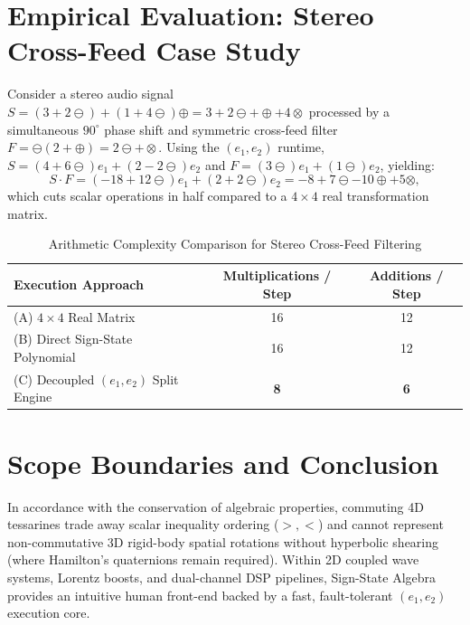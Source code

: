 \documentclass[11pt,a4paper]{article}
\begin{document}
\section{Empirical Evaluation: Stereo Cross-Feed Case Study}
Consider a stereo audio signal $S = (3 + 2\ominus) + (1 + 4\ominus)\oplus = 3 + 2\ominus + \oplus + 4\otimes$ processed by a simultaneous $90^\circ$ phase shift and symmetric cross-feed filter $F = \ominus(2 + \oplus) = 2\ominus + \otimes$. Using the $(e_1, e_2)$ runtime, $S = (4 + 6\ominus)e_1 + (2 - 2\ominus)e_2$ and $F = (3\ominus)e_1 + (1\ominus)e_2$, yielding:
\begin{equation}
S \cdot F = (-18 + 12\ominus)e_1 + (2 + 2\ominus)e_2 = -8 + 7\ominus - 10\oplus + 5\otimes,
\end{equation}
which cuts scalar operations in half compared to a $4 \times 4$ real transformation matrix.

\begin{table}[h]
\centering
\caption{Arithmetic Complexity Comparison for Stereo Cross-Feed Filtering}
\label{tab:benchmark}
\begin{tabular}{@{}lcc@{}}
\toprule
Execution Approach & Multiplications / Step & Additions / Step \\
\midrule
(A) $4 \times 4$ Real Matrix & 16 & 12 \\
(B) Direct Sign-State Polynomial & 16 & 12 \\
(C) Decoupled $(e_1, e_2)$ Split Engine & \textbf{8} & \textbf{6} \\
\bottomrule
\end{tabular}
\end{table}

\section{Scope Boundaries and Conclusion}
In accordance with the conservation of algebraic properties, commuting 4D tessarines trade away scalar inequality ordering ($>, <$) and cannot represent non-commutative 3D rigid-body spatial rotations without hyperbolic shearing (where Hamilton's quaternions remain required). Within 2D coupled wave systems, Lorentz boosts, and dual-channel DSP pipelines, Sign-State Algebra provides an intuitive human front-end backed by a fast, fault-tolerant $(e_1, e_2)$ execution core.



\end{document}
